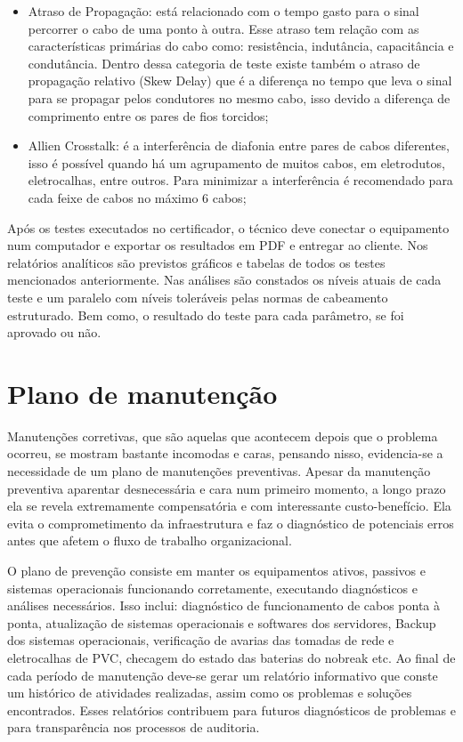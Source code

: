 \documentclass[	DIV=calc,%
							paper=a4,%
							fontsize=12pt,%
							onecolumn]{scrartcl}	 					%
\begin{document}
\begin{itemize}
	\item Atraso de Propagação: está relacionado com o tempo gasto para o sinal percorrer o cabo de uma ponto à outra. Esse atraso tem relação com as características primárias do cabo como: resistência, indutância, capacitância e condutância. Dentro dessa categoria de teste existe também o atraso de propagação relativo (Skew Delay) que é a diferença no tempo que leva o sinal para se propagar pelos condutores no mesmo cabo, isso devido a diferença de comprimento entre os pares de fios torcidos;
	\item Allien Crosstalk: é a interferência de diafonia entre pares de cabos diferentes, isso é possível quando há um agrupamento de muitos cabos, em eletrodutos, eletrocalhas, entre outros. Para minimizar a interferência é recomendado para cada feixe de cabos no máximo 6 cabos;
\end{itemize}

Após os testes executados no certificador, o técnico deve conectar o equipamento num computador e exportar os resultados em PDF e entregar ao cliente. Nos relatórios analíticos são previstos gráficos e tabelas de todos os testes mencionados anteriormente. Nas análises são constados os níveis atuais de cada teste e um paralelo com níveis toleráveis pelas normas de cabeamento estruturado. Bem como, o resultado do teste para cada parâmetro, se foi aprovado ou não.


\section{Plano de manutenção}

Manutenções corretivas, que são aquelas que acontecem depois que o problema ocorreu, se mostram bastante incomodas e caras, pensando nisso, evidencia-se a necessidade de um plano de manutenções preventivas. Apesar da manutenção preventiva aparentar desnecessária e cara num primeiro momento, a longo prazo ela se revela extremamente compensatória e com interessante custo-benefício. Ela evita o comprometimento da infraestrutura e faz o diagnóstico de potenciais erros antes que afetem o fluxo de trabalho organizacional.

O plano de prevenção consiste em manter os equipamentos ativos, passivos e sistemas operacionais funcionando corretamente, executando diagnósticos e análises necessários. Isso inclui: diagnóstico de funcionamento de cabos ponta à ponta, atualização de sistemas operacionais e softwares dos servidores, Backup dos sistemas operacionais, verificação de avarias das tomadas de rede e eletrocalhas de PVC, checagem do estado das baterias do nobreak etc. Ao final de cada período de manutenção deve-se gerar um relatório informativo que conste um histórico de atividades realizadas, assim como os problemas e soluções encontrados. Esses relatórios contribuem para futuros diagnósticos de problemas e para transparência nos processos de auditoria.
\end{document}
